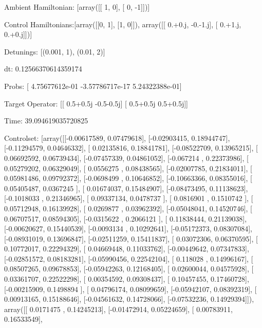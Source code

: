 \documentclass{article}
\begin{document}
    

\newpage

Ambient Hamiltonian: [array([[ 1,  0],
       [ 0, -1]])]

Control Hamiltonians:[array([[0, 1],
       [1, 0]]), array([[ 0.+0.j, -0.-1.j],
       [ 0.+1.j,  0.+0.j]])]

Detunings: [(0.001, 1), (0.01, 2)]

 dt: 0.12566370614359174

Probs: [  4.75677612e-01  -3.57786717e-17   5.24322388e-01]

Target Operator: [[ 0.5+0.5j -0.5-0.5j]
 [ 0.5+0.5j  0.5+0.5j]]

Time: 39.094619035720825

Controlset: [array([[-0.00617589,  0.07479618],
       [-0.02903415,  0.18944747],
       [-0.11294579,  0.04646332],
       [ 0.02135816,  0.18841781],
       [-0.08522709,  0.13965215],
       [ 0.06692592,  0.06739434],
       [-0.07457339,  0.04861052],
       [-0.067214  ,  0.22373986],
       [ 0.05279202,  0.06329049],
       [ 0.0556275 ,  0.08438565],
       [-0.02007785,  0.21834011],
       [ 0.05981486,  0.09792372],
       [-0.0698499 ,  0.10646852],
       [-0.10663366,  0.08355016],
       [ 0.05405487,  0.0367245 ],
       [ 0.01674037,  0.15484907],
       [-0.08473495,  0.11138623],
       [-0.1018033 ,  0.21346965],
       [ 0.09337134,  0.0478737 ],
       [ 0.0816901 ,  0.1510742 ],
       [ 0.05712948,  0.16139928],
       [ 0.0269877 ,  0.03962392],
       [-0.05048041,  0.14520746],
       [ 0.06707517,  0.08594305],
       [-0.0315622 ,  0.2066121 ],
       [ 0.11838444,  0.21139038],
       [-0.00620627,  0.15440539],
       [-0.0093134 ,  0.10292641],
       [-0.05172373,  0.08307084],
       [-0.08931019,  0.13696847],
       [-0.02511259,  0.15411837],
       [ 0.03072306,  0.06370595],
       [ 0.10772017,  0.22294329],
       [ 0.04669448,  0.11033762],
       [-0.00449642,  0.07347833],
       [-0.02851572,  0.08183281],
       [-0.05990456,  0.22542104],
       [ 0.118028  ,  0.14996167],
       [ 0.08507265,  0.09678853],
       [-0.05942263,  0.12168405],
       [ 0.02600044,  0.04575928],
       [ 0.03361707,  0.22522298],
       [ 0.00354592,  0.09308437],
       [ 0.10457455,  0.17460728],
       [-0.00215909,  0.1498894 ],
       [ 0.04796174,  0.08099659],
       [-0.05942107,  0.08392319],
       [ 0.00913165,  0.15188646],
       [-0.04561632,  0.14728066],
       [-0.07532236,  0.14929394]]), array([[ 0.0171475 ,  0.14245213],
       [-0.01472914,  0.05224659],
       [ 0.00783911,  0.16533549],
\end{document}
